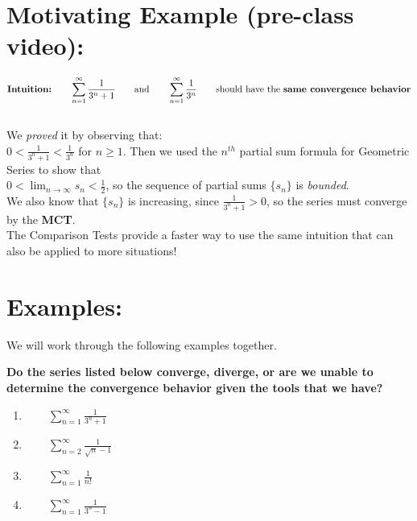 

\section*{Motivating Example (pre-class video):}
\[
\text{\textbf{Intuition:}} \qquad  \sum_{n=1}^\infty \frac{1}{3^n +1} \qquad \text{and} \qquad \sum_{n=1}^\infty \frac{1}{3^n} \qquad \text{should have the \textbf{same convergence behavior}}
\]
~\\

We \textit{proved} it by observing that:\\
\( 0 <  \frac{1}{3^n +1} <  \frac{1}{3^n}\) for \(n\geq 1\). 
 Then
we used the \(n^{th}\) partial sum formula for Geometric Series to show that %
 \\
\( 0 < \lim_{n\rightarrow \infty} s_n < \frac{1}{2}\), so the sequence of partial sums \(\lbrace s_n\rbrace\) is \textit{bounded}.\\

We also know that \(\lbrace s_n\rbrace\) is increasing, since \( \frac{1}{3^n +1}>0\), so the series must converge by the \textbf{MCT}.\\

The Comparison Tests provide a faster way to use the same intuition that can also be applied to more situations!

\pagebreak

\section*{Examples:}
We will work through the following examples together.

\textbf{Do the series listed below converge, diverge, or are we unable to determine the convergence behavior given the tools that we have?}

\begin{enumerate}[{Example }1:]


\item \(\qquad \sum_{n=1}^\infty \frac{1}{3^n +1}\) \vfill

\item \(\qquad \sum_{n=2}^\infty \frac{1}{\sqrt{n}-1}\) \vfill

\item \(\qquad \sum_{n=1}^\infty \frac{1}{n!}\) \vfill

\item \(\qquad \sum_{n=1}^\infty \frac{1}{3^n-1}\) \vfill


\end{enumerate}

